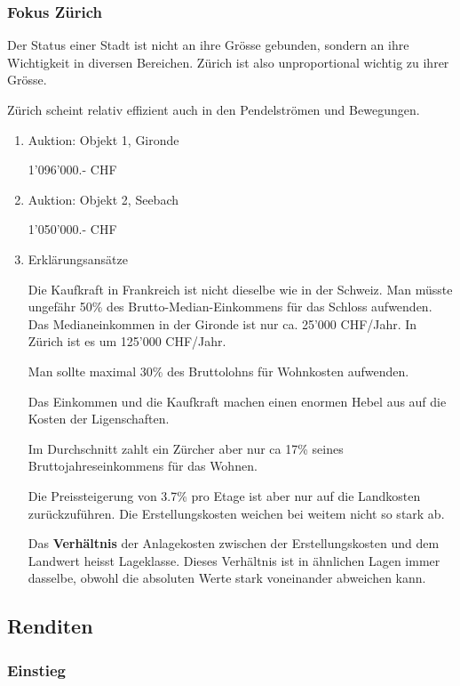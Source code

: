\documentclass[11pt]{article}
\begin{document}
\subsubsection{Fokus Zürich}
\label{sec-2-2-3}

Der Status einer Stadt ist nicht an ihre Grösse gebunden, sondern an ihre
Wichtigkeit in diversen Bereichen. Zürich ist also unproportional wichtig zu
ihrer Grösse.

Zürich scheint relativ effizient auch in den Pendelströmen und Bewegungen.

\begin{enumerate}
\item Auktion: Objekt 1, Gironde
\label{sec-2-2-3-1}

1'096'000.- CHF

\item Auktion: Objekt 2, Seebach
\label{sec-2-2-3-2}

1'050'000.- CHF

\item Erklärungsansätze
\label{sec-2-2-3-3}

Die Kaufkraft in Frankreich ist nicht dieselbe wie in der Schweiz. Man
müsste ungefähr 50\% des Brutto-Median-Einkommens für das Schloss
aufwenden. Das Medianeinkommen in der Gironde ist nur ca. 25'000
CHF/Jahr. In Zürich ist es um 125'000 CHF/Jahr.

Man sollte maximal 30\% des Bruttolohns für Wohnkosten aufwenden.

Das Einkommen und die Kaufkraft machen einen enormen Hebel aus auf die
Kosten der Ligenschaften.

Im Durchschnitt zahlt ein Zürcher aber nur ca 17\% seines
Bruttojahreseinkommens für das Wohnen.

Die Preissteigerung von 3.7\% pro Etage ist aber nur auf die Landkosten
zurückzuführen. Die Erstellungskosten weichen bei weitem nicht so stark
ab.

Das \textbf{Verhältnis} der Anlagekosten zwischen der Erstellungskosten und dem
Landwert heisst Lageklasse. Dieses Verhältnis ist in ähnlichen Lagen immer
dasselbe, obwohl die absoluten Werte stark voneinander abweichen kann.
\end{enumerate}

\subsection{Renditen}
\label{sec-2-3}

\subsubsection{Einstieg}
\label{sec-2-3-1}
\end{document}
